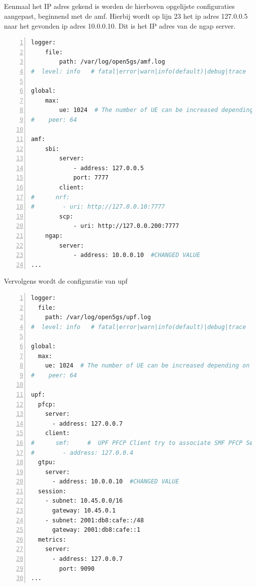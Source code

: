 \subsection{}%
\label{sec:open5gs_amf}%

Eenmaal het IP adres gekend is worden de hierboven opgelijste configuraties aangepast, beginnend met de \gls{amf}. Hierbij wordt op lijn 23 het ip adres 127.0.0.5 naar het gevonden ip adres 10.0.0.10. Dit is het IP  adres van de ngap server.

\begin{lstlisting}[basicstyle=\small, frame=single, breaklines=true, postbreak=\mbox{\textcolor{red}{$\hookrightarrow$}\space}, escapeinside ={\%,}, escapechar={!}, numbers=left, language=sh, caption=Open5GS amf configuratie]
logger:
    file:
        path: /var/log/open5gs/amf.log
#  level: info   # fatal|error|warn|info(default)|debug|trace

global:
    max:
        ue: 1024  # The number of UE can be increased depending on memory size.
#    peer: 64

amf:
    sbi:
        server:
            - address: 127.0.0.5
            port: 7777
        client:
#      nrf:
#        - uri: http://127.0.0.10:7777
        scp:
            - uri: http://127.0.0.200:7777
    ngap:
        server:
            - address: 10.0.0.10  #CHANGED VALUE
...
\end{lstlisting}

Vervolgens wordt de configuratie van \gls{upf}

\begin{lstlisting}[basicstyle=\small, frame=single, breaklines=true, postbreak=\mbox{\textcolor{red}{$\hookrightarrow$}\space}, escapeinside ={\%,}, escapechar={!}, numbers=left, language=sh, caption=Open5GS upf configuratie]
logger:
  file:
    path: /var/log/open5gs/upf.log
#  level: info   # fatal|error|warn|info(default)|debug|trace

global:
  max:
    ue: 1024  # The number of UE can be increased depending on memory size.
#    peer: 64

upf:
  pfcp:
    server:
      - address: 127.0.0.7
    client:
#      smf:     #  UPF PFCP Client try to associate SMF PFCP Server
#        - address: 127.0.0.4
  gtpu:
    server:
      - address: 10.0.0.10  #CHANGED VALUE
  session:
    - subnet: 10.45.0.0/16
      gateway: 10.45.0.1
    - subnet: 2001:db8:cafe::/48
      gateway: 2001:db8:cafe::1
  metrics:
    server:
      - address: 127.0.0.7
        port: 9090
...
\end{lstlisting}

